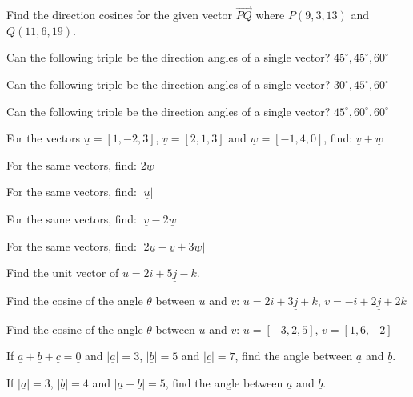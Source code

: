 \documentclass[11pt,a4paper]{article}
\begin{document}
\begin{shortlist}
\item Find the direction cosines for the given vector $\overrightarrow{PQ}$ where $P(9,3,13)$ and $Q(11,6,19)$.

\item Can the following triple be the direction angles of a single vector? $45^{\circ}, 45^{\circ}, 60^{\circ}$

\item Can the following triple be the direction angles of a single vector? $30^{\circ}, 45^{\circ}, 60^{\circ}$

\item Can the following triple be the direction angles of a single vector? $45^{\circ}, 60^{\circ}, 60^{\circ}$

\item For the vectors $\underline{u}=[1,-2,3]$, $\underline{v}=[2,1,3]$ and $\underline{w}=[-1,4,0]$, find: $\underline{v}+\underline{w}$

\item For the same vectors, find: $2\underline{w}$

\item For the same vectors, find: $|\underline{u}|$

\item For the same vectors, find: $|\underline{v}-2\underline{w}|$

\item For the same vectors, find: $|2\underline{u}-\underline{v}+3\underline{w}|$

\item Find the unit vector of $\underline{u}=2\underline{i}+5\underline{j}-\underline{k}$.

\item Find the cosine of the angle $\theta$ between $\underline{u}$ and $\underline{v}$: $\underline{u}=2\underline{i}+3\underline{j}+\underline{k}$, $\underline{v}=-\underline{i}+2\underline{j}+2\underline{k}$

\item Find the cosine of the angle $\theta$ between $\underline{u}$ and $\underline{v}$: $\underline{u}=[-3,2,5]$, $\underline{v}=[1,6,-2]$

\item If $\underline{a}+\underline{b}+\underline{c}=\underline{0}$ and $|\underline{a}|=3$, $|\underline{b}|=5$ and $|\underline{c}|=7$, find the angle between $\underline{a}$ and $\underline{b}$.

\item If $|\underline{a}|=3$, $|\underline{b}|=4$ and $|\underline{a}+\underline{b}|=5$, find the angle between $\underline{a}$ and $\underline{b}$.


\end{shortlist}
\end{document}
